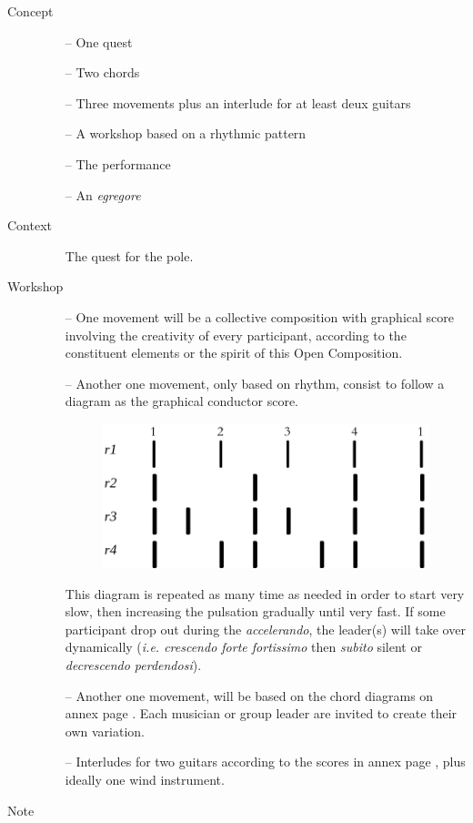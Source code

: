 \begin{description}
\item[Concept] \hfill 
\begin{itemize}
\item[--] One quest
\item[--] Two chords
\item[--] Three movements plus an interlude for at least deux guitars
\item[--] A workshop based on a rhythmic pattern
\item[--] The performance
\item[--] An \textit{egregore}
\end{itemize}
\bigskip
\item[Context] \hfill 
\begin{itemize}
\item[] The quest for the pole.
\end{itemize}
\bigskip
\item[Workshop] \hfill 
\begin{itemize}
\item[--] One movement will be a collective composition with graphical score involving the creativity of every participant, according to the constituent elements or the spirit of this Open Composition.  
\item[--] Another one movement, only based on rhythm, consist to follow a diagram as the graphical conductor score. 
 \begin{figure}[H]
\begin{center}
\includegraphics[scale=0.3]{img/nrtm}
\end{center}
\end{figure}
This diagram %
is repeated as many time as needed in order to start very slow, then increasing the pulsation gradually until very fast. If some participant drop out during the \textit{accelerando}, the leader(s) will take over dynamically (\textit{i.e. crescendo forte fortissimo} then \textit{subito} silent or \textit{decrescendo perdendosi}).
\item[--] Another one movement, will be based on the chord diagrams on annex page \pageref{oco2}. Each musician or group leader are invited to create their own variation.
\item[--] Interludes for two guitars according to the scores in annex page \pageref{interlude}, plus ideally one wind instrument.
\end{itemize}
\bigskip
\item[Note] \hfill 


\end{description}

